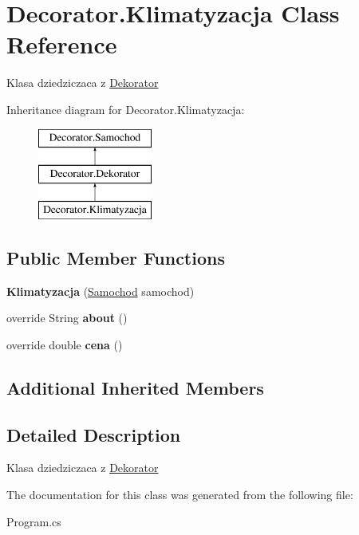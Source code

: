\hypertarget{class_decorator_1_1_klimatyzacja}{}\section{Decorator.\+Klimatyzacja Class Reference}
\label{class_decorator_1_1_klimatyzacja}


Klasa dziedziczaca z \hyperlink{class_decorator_1_1_dekorator}{Dekorator}  


Inheritance diagram for Decorator.\+Klimatyzacja\+:\begin{figure}[H]
\begin{center}
\leavevmode
\includegraphics[height=3.000000cm]{class_decorator_1_1_klimatyzacja}
\end{center}
\end{figure}
\subsection*{Public Member Functions}
\begin{DoxyCompactItemize}
\item 
\mbox{\label{class_decorator_1_1_klimatyzacja_aeb6393dfcaddcaeac296e873824e5f7d}} 
{\bfseries Klimatyzacja} (\hyperlink{class_decorator_1_1_samochod}{Samochod} samochod)
\item 
\mbox{\label{class_decorator_1_1_klimatyzacja_a0f8564f1298a5d410506a3ea87bad970}} 
override String {\bfseries about} ()
\item 
\mbox{\label{class_decorator_1_1_klimatyzacja_ac94c3f63d29ed8edff7e41053f01adda}} 
override double {\bfseries cena} ()
\end{DoxyCompactItemize}
\subsection*{Additional Inherited Members}


\subsection{Detailed Description}
Klasa dziedziczaca z \hyperlink{class_decorator_1_1_dekorator}{Dekorator} 



The documentation for this class was generated from the following file\+:\begin{DoxyCompactItemize}
\item 
Program.\+cs\end{DoxyCompactItemize}
